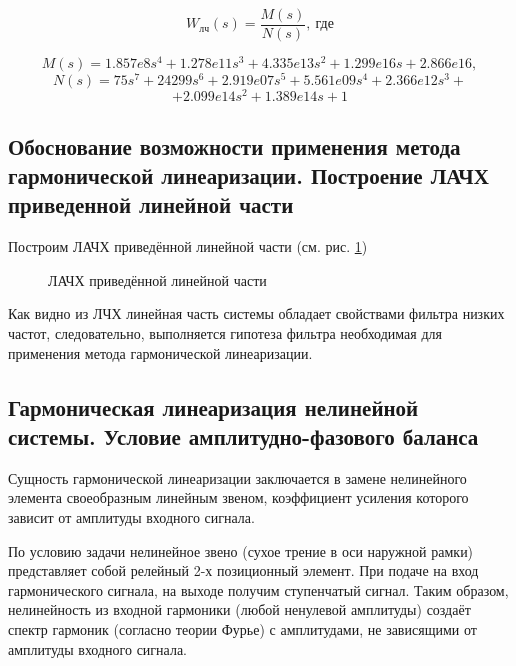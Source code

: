 \documentclass[main.tex]{subfiles}
\begin{document}
  \[  W_\text{лч}(s) = \frac{M(s)}{N(s)},\ \text{где}\]

\[ M(s) = 1.857e8s^4 + 1.278e11s^3 + 4.335e13s^2 + 1.299e16s + 2.866e16, \]
 \[ N(s) =   75s^7 + 24299s^6 + 2.919e07 s^5 + 5.561e09s^4 + 2.366e12s^3 +\]
 \[+ 2.099e14s^2 + 1.389e14s + 1 \]


\subsection{ Обоснование возможности применения метода гармонической линеаризации. 
Построение ЛАЧХ приведенной линейной части}

Построим ЛАЧХ приведённой линейной части (см. рис. \ref{fig:p11_lahi}) \par
\begin{figure}[!h]
    \caption{ЛАЧХ приведённой линейной части}
    \label{fig:p11_lahi}
\end{figure}  
Как видно из ЛЧХ линейная часть системы обладает свойствами фильтра низких частот, следовательно,
 выполняется гипотеза фильтра необходимая для применения метода гармонической линеаризации.

\subsection{Гармоническая линеаризация нелинейной системы. Условие амплитудно-фазового баланса}
Сущность гармонической линеаризации заключается в замене нелинейного элемента своеобразным линейным звеном, 
коэффициент усиления которого зависит от амплитуды входного сигнала. \par
По условию задачи нелинейное звено (сухое трение в оси наружной рамки) представляет собой
 релейный 2-х позиционный элемент. При подаче на вход гармонического сигнала, 
 на выходе получим ступенчатый сигнал. Таким образом, нелинейность из входной гармоники 
 (любой ненулевой амплитуды) создаёт спектр гармоник (согласно теории Фурье) с амплитудами, 
 не зависящими от амплитуды входного сигнала. \par
\end{document}
